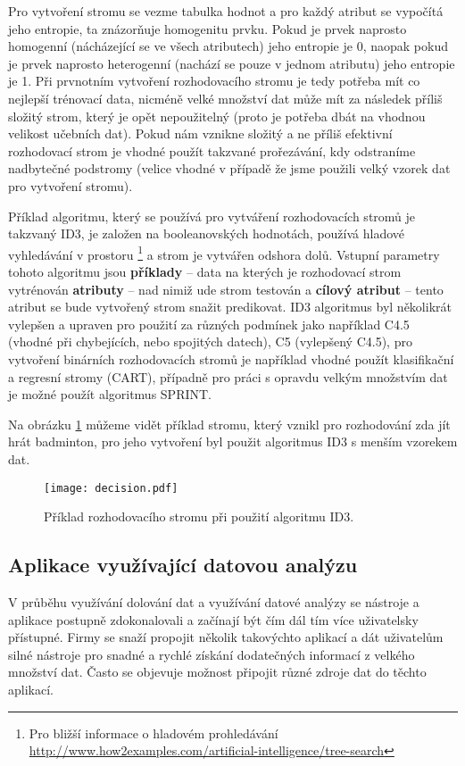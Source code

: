 \par Pro vytvoření stromu se vezme tabulka hodnot a pro každý atribut se vypočítá jeho entropie, ta znázorňuje homogenitu prvku. Pokud je prvek naprosto homogenní (nácházející se ve všech atributech) jeho entropie je 0, naopak pokud je prvek naprosto heterogenní (nachází se pouze v jednom atributu) jeho entropie je 1. Při prvnotním vytvoření rozhodovacího stromu je tedy potřeba mít co nejlepší trénovací data, nicméně velké množství dat může mít za následek příliš složitý strom, který je opět nepoužitelný (proto je potřeba dbát na vhodnou velikost učebních dat). Pokud nám vznikne složitý a ne příliš efektivní rozhodovací strom je vhodné použít takzvané prořezávání, kdy odstraníme nadbytečné podstromy (velice vhodné v případě že jsme použili velký vzorek dat pro vytvoření stromu).

\par Příklad algoritmu, který se používá pro vytváření rozhodovacích stromů je takzvaný ID3, je založen na booleanovských hodnotách, používá hladové vyhledávání v prostoru \footnote{Pro bližší informace o hladovém prohledávání \url{http://www.how2examples.com/artificial-intelligence/tree-search}} a strom je vytvářen odshora dolů. Vstupní parametry tohoto algoritmu jsou \textbf{příklady} -- data na kterých je rozhodovací strom vytrénován \textbf{atributy} -- nad nimiž ude strom testován a \textbf{cílový atribut} -- tento atribut se bude vytvořený strom snažit predikovat. ID3 algoritmus byl několikrát vylepšen a upraven pro použití za různých podmínek jako například C4.5 (vhodné při chybejících, nebo spojitých datech), C5 (vylepšený C4.5), pro vytvoření binárních rozhodovacích stromů je například vhodné použít klasifikační a regresní stromy (CART), případně pro práci s opravdu velkým množstvím dat je možné použít algoritmus SPRINT.

\par Na obrázku \ref{decision-tree} můžeme vidět příklad stromu, který vznikl pro rozhodování zda jít hrát badminton, pro jeho vytvoření byl použit algoritmus ID3 s menším vzorekem dat.
\begin{figure}[htp]
  \centering
  \texttt{[image: decision.pdf]}
  \caption{Příklad rozhodovacího stromu při použití algoritmu ID3.}
  \label{decision-tree}
\end{figure}

\subsection{Aplikace využívající datovou analýzu}
\par V průběhu využívání dolování dat a využívání datové analýzy se nástroje a aplikace postupně zdokonalovali a začínají být čím dál tím více uživatelsky přístupné. Firmy se snaží propojit několik takovýchto aplikací a dát uživatelům silné nástroje pro snadné a rychlé získání dodatečných informací z velkého množství dat. Často se objevuje možnost připojit různé zdroje dat do těchto aplikací.

